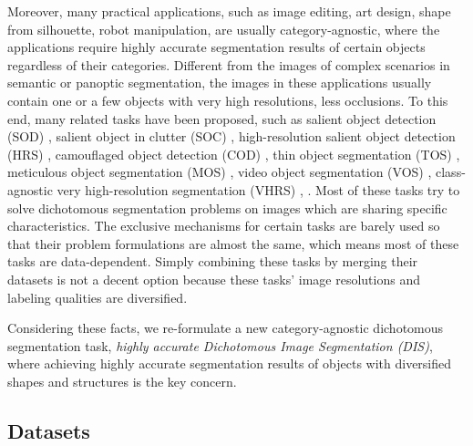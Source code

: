 \documentclass[10pt,twocolumn,letterpaper]{article}
\begin{document}
Moreover, many practical applications, such as image editing, art design, shape from silhouette, robot manipulation, are usually category-agnostic, where the applications require highly accurate segmentation results of certain objects regardless of their categories. Different from the images of complex scenarios in semantic \cite{lin2014microsoft} or panoptic \cite{zhou2017scene} segmentation, the images in these applications usually contain one or a few objects with very high resolutions, less occlusions. To this end, many related tasks have been proposed, such as salient object detection (SOD) \cite{movahedi2010design,yan2013hierarchical,DBLP:journals/pami/LiuYSWZTS11,yang2013saliency,DBLP:journals/pami/ChengMHTH15,wang2017learning,wang2019salient}, salient object in clutter (SOC) \cite{fan2018SOC}, high-resolution salient object detection (HRS) \cite{zeng2019towards}, camouflaged object detection (COD) \cite{le2019anabranch, chameleon,fan2020camouflaged}, thin object segmentation (TOS) \cite{liew2021deep}, meticulous object segmentation (MOS) \cite{yang2020meticulous}, video object segmentation (VOS) \cite{perazzi2016benchmark}, class-agnostic very high-resolution segmentation (VHRS) \cite{cheng2020cascadepsp}, \etc. 
Most of these tasks try to solve dichotomous segmentation problems on images which are sharing specific characteristics. 
The exclusive mechanisms for certain tasks are barely used so that their problem formulations are almost the same, which means most of these tasks are data-dependent. Simply combining these tasks by merging their datasets is not a decent option because these tasks' image resolutions and labeling qualities are diversified.  

Considering these facts, we re-formulate a new category-agnostic dichotomous segmentation task, \textit{highly accurate Dichotomous Image Segmentation (DIS)}, where achieving highly accurate segmentation results of objects with diversified shapes and structures is the key concern. 

\subsection{Datasets} 
\end{document}
